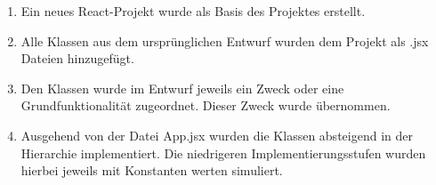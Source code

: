 \begin{enumerate}
    \item Ein neues React-Projekt wurde als Basis des Projektes erstellt.
    \item Alle Klassen aus dem ursprünglichen Entwurf wurden dem Projekt als .jsx Dateien hinzugefügt.
    \item Den Klassen wurde im Entwurf jeweils ein Zweck oder eine Grundfunktionalität zugeordnet. Dieser Zweck wurde übernommen.
    \item Ausgehend von der Datei App.jsx wurden die Klassen absteigend in der Hierarchie implementiert. Die niedrigeren Implementierungsstufen wurden hierbei jeweils mit Konstanten werten simuliert.
\end{enumerate}